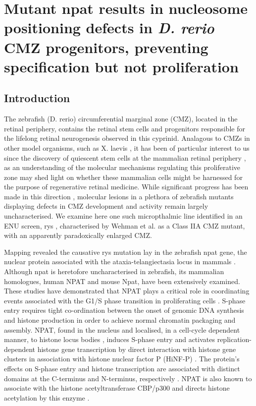 \chapter{Mutant npat results in nucleosome positioning defects in \textit{D. rerio} CMZ progenitors, preventing specification but not proliferation}
\label{chap:rys}
\section{Introduction}
The zebrafish (D. rerio) circumferential marginal zone (CMZ), located in the retinal periphery, contains the retinal stem cells and progenitors responsible for the lifelong retinal neurogenesis observed in this cyprinid. Analagous to CMZs in other model organisms, such as X. laevis \cite{Perron1998}, it has been of particular interest to us since the discovery of quiescent stem cells at the mammalian retinal periphery \cite{Tropepe2000}, as an understanding of the molecular mechanisms regulating this proliferative zone may shed light on whether these mammalian cells might be harnessed for the purpose of regenerative retinal medicine. While significant progress has been made in this direction \cite{Raymond2006}, molecular lesions in a plethora of zebrafish mutants displaying defects in CMZ development and activity remain largely uncharacterised. We examine here one such micropthalmic line identified in an ENU screen, rys \cite{Wehman2005}, characterised by Wehman et al. as a Class IIA CMZ mutant, with an apparently paradoxically enlarged CMZ.

Mapping revealed the causative rys mutation lay in the zebrafish npat gene, the nuclear protein associated with the ataxia-telangiectasia locus in mammals \cite{Imai1996}. Although npat is heretofore uncharacterised in zebrafish, its mammalian homologues, human NPAT and mouse Npat, have been extensively examined. These studies have demonstrated that NPAT plays a critical role in coordinating events associated with the G1/S phase transition in proliferating cells \cite{Ye2003}. S-phase entry requires tight co-ordination between the onset of genomic DNA synthesis and histone production in order to achieve normal chromatin packaging and assembly. NPAT, found in the nucleus \cite{Sagara2002} and localised, in a cell-cycle dependent manner, to histone locus bodies \cite{Ghule2009}, induces S-phase entry \cite{Zhao1998} and activates replication-dependent histone gene transcription by direct interaction with histone gene clusters \cite{Zhao2000} in association with histone nuclear factor P (HiNF-P) \cite{Mitra2003}. The protein’s effects on S-phase entry and histone transcription are associated with distinct domains at the C-terminus and N-terminus, respectively \cite{Wei2003}. NPAT is also known to associate with the histone acetyltransferase CBP/p300 \cite{Wang2004} and directs histone acetylation by this enzyme \cite{He2011}.

